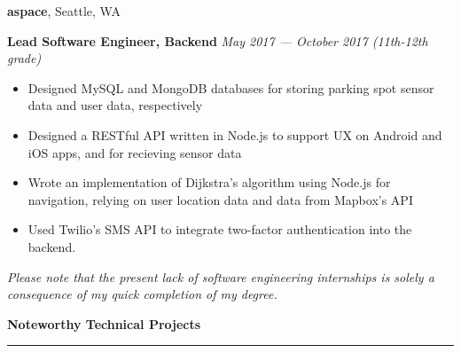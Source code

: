 \documentclass[10pt]{article}
\begin{document}
\begin{flushleft}
		\vspace{-1.50mm}
		\textbf{aspace}, Seattle, WA\\
		\begin{leftli}
			{\small \textbf{Lead Software Engineer, Backend}} \hfill \textit{\small May 2017 --- October 2017 (11th-12th grade)}

			\begin{itemize}
				\item Designed MySQL and MongoDB databases for storing parking spot sensor data and user data, respectively
				\vspace{-2mm}
				\item Designed a RESTful API written in Node.js to support UX on Android and iOS apps, and for recieving sensor data
				\vspace{-2mm}
				\item Wrote an implementation of Dijkstra's algorithm using Node.js for navigation, relying on user location data and data from Mapbox's API
				\vspace{-2mm}
				\item Used Twilio's SMS API to integrate two-factor authentication into the backend.
			\end{itemize}
		\end{leftli}

		{\footnotesize \textit{Please note that the present lack of software engineering internships is solely a consequence of my quick completion of my degree.}}

		\vspace{1.25mm}
		{\large \raggedright \textbf{Noteworthy Technical Projects}}
		\vspace{1.25mm}
	
		\hrule
	

\end{flushleft}
\end{document}
